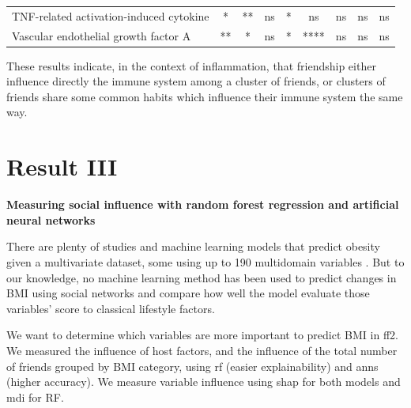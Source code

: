 \begin{table}[ht]
{\begin{tabular}{lcccccccc}
\multicolumn{1}{l|}{TNF-related activation-induced cytokine}                                               & *                                     & **                                  & ns                                     & *                                      & ns                                  & ns                                 & ns                                    & ns                                    \\
\multicolumn{1}{l|}{Vascular endothelial growth factor A}                                                  & **                                    & *                                   & ns                                     & *                                      & ****                                & ns                                 & ns                                    & ns                                   
\end{tabular}

}

\label{table:BiomarkersAntropoFemales}
\end{table}


These results indicate, in the context of inflammation, that friendship either influence directly the immune system among a cluster of friends, or clusters of friends share some common habits which influence their immune system the same way. 


\clearpage

\section{Result III}

\textbf{Measuring social influence with random forest regression and artificial neural networks}

There are plenty of studies and machine learning models that predict obesity given a multivariate dataset, some using up to 190 multidomain variables \cite{MarcosPasero2021}. But to our knowledge, no machine learning method has been used to predict changes in BMI using social networks and compare how well the model evaluate those variables' score to classical lifestyle factors.

We want to determine which variables are more important to predict BMI in \gls{ff2}. We measured the influence of host factors, and the influence of the total number of friends grouped by BMI category, using \gls{rf} (easier explainability) and \gls{anns} (higher accuracy). We measure variable influence using \gls{shap} for both models and \gls{mdi} for RF.

